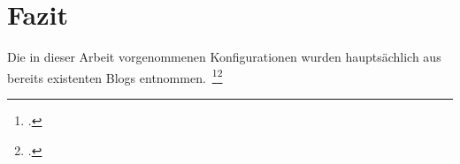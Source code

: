 
\section{Fazit}\label{sec:fazit}

Die in dieser Arbeit vorgenommenen Konfigurationen wurden hauptsächlich aus bereits existenten Blogs entnommen.~\footcite{rasp-hardening}\footcite{rasp-vuln-prev}